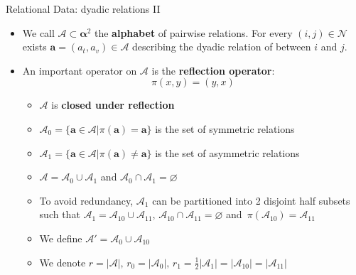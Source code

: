 \documentclass[aspectratio=169,xcolor=dvipsnames]{beamer}
\newcommand{\veca}{\boldsymbol{a}}
\newcommand{\vecalpha}{\boldsymbol{\alpha}}
\newcommand{\setn}{\mathcal{N}}
\newcommand{\seta}{\mathcal{A}}
\begin{document}
\begin{frame}{Relational Data: dyadic relations II}
\begin{itemize}
\item We call $\seta \subset \vecalpha^2$ the \textbf{alphabet} of pairwise relations. For every $(i,j) \in \setn$ exists $\veca = (a_t, a_v) \in \seta$ describing the dyadic relation of between $i$ and $j$.
\item An important operator on $\seta$ is the \textbf{reflection operator}:
$$ 
\pi(x, y) = (y, x)
$$
\vspace{-15pt}
\begin{itemize}%
    \setlength\itemsep{0.4em}
    \item $\seta$ is \textbf{closed under reflection}
    \item $\seta_0 = \{\veca\in\seta | \pi(\veca)=\veca\}$ is the set of symmetric relations
    \item $\seta_1 = \{\veca\in\seta | \pi(\veca)\neq\veca\}$ is the set of asymmetric relations
    \item $\seta = \seta_0\cup \seta_1$ and $\seta_0\cap \seta_1 = \varnothing$
    \item To avoid redundancy, $\seta_1$ can be partitioned into 2 disjoint half subsets such that $\seta_1 = \seta_{10}\cup\seta_{11},\, \seta_{10}\cap\seta_{11} = \varnothing$ and $\, \pi(\seta_{10}) = \seta_{11}$
    \item We define $\seta' = \seta_{0} \cup \seta_{10}$ 
    \item We denote $r = |\seta|,\, r_0 = |\seta_0|, \,r_1 = \frac{1}{2}|\seta_1| = |\seta_{10}| = |\seta_{11}|$
    
\end{itemize}
\end{itemize}
\end{frame}
\end{document}
